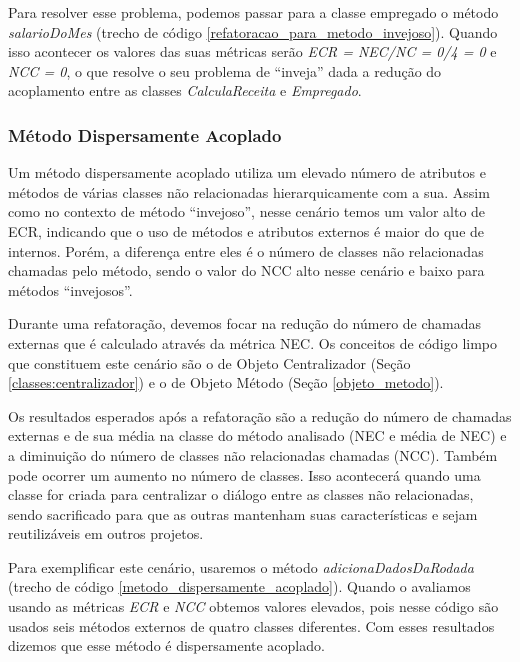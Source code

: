 Para resolver esse problema, podemos passar para a classe empregado o método \textit{salarioDoMes} (trecho de código \ref{refatoracao_para_metodo_invejoso}). Quando isso acontecer os valores das suas métricas serão \textit{ECR = NEC/NC = 0/4 = 0} e \textit{NCC = 0}, o que resolve o seu problema de ``inveja'' dada a redução do acoplamento entre as classes \textit{CalculaReceita} e \textit{Empregado}. 




\subsubsection{Método Dispersamente Acoplado}
\label{cenario_metodo_dispersamente_acoplado}	

Um método dispersamente acoplado utiliza um elevado número de atributos e métodos de várias classes não relacionadas hierarquicamente com a sua. Assim como no contexto de método ``invejoso'', nesse cenário temos um valor alto de ECR, indicando que o uso de métodos e atributos externos é maior do que de internos. Porém, a diferença entre eles é o número de classes não relacionadas chamadas pelo método, sendo o valor do NCC alto nesse cenário e baixo para métodos ``invejosos''.
	
Durante uma refatoração, devemos focar na redução do número de chamadas externas que é calculado através da métrica NEC. Os conceitos de código limpo que constituem este cenário são o de Objeto Centralizador (Seção \ref{classes:centralizador}) e o de Objeto Método (Seção \ref{objeto_metodo}).
	
Os resultados esperados após a refatoração são a redução do número de chamadas externas e de sua média na classe do método analisado (NEC e média de NEC) e a diminuição do número de classes não relacionadas chamadas (NCC). Também pode ocorrer um aumento no número de classes. Isso acontecerá quando uma classe for criada para centralizar o diálogo entre as classes não relacionadas, sendo sacrificado para que as outras mantenham suas características e sejam reutilizáveis em outros projetos. 
	  
Para exemplificar este cenário, usaremos o método \textit{adicionaDadosDaRodada} (trecho de código \ref{metodo_dispersamente_acoplado}). Quando o avaliamos usando as métricas \textit{ECR} e \textit{NCC} obtemos valores elevados, pois nesse código são usados seis métodos externos de quatro classes diferentes. Com esses resultados dizemos que esse método é dispersamente acoplado.
  
